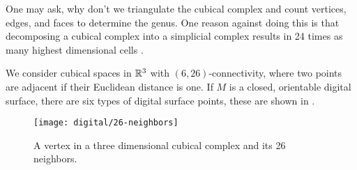 One may ask, why don't we triangulate the cubical complex and
count vertices, edges, and faces to determine the genus.
One reason against doing this is that 
decomposing a cubical complex into a simplicial complex
results in 24 times as many highest dimensional cells \cite{Kaczynski2003}.


We consider cubical spaces in $\mathbb{R}^3$ with $(6,26)$-connectivity,
where two points are adjacent if their Euclidean distance is one.
If $M$ is a closed, orientable digital surface, there are
six types of digital surface points, these are shown in .

\begin{figure}[htb]
        \centering
        \texttt{[image: digital/26-neighbors]}
		\caption{A vertex in a three dimensional cubical complex and its 26 neighbors.
		\label{fig:26-neighbors}}
\end{figure}


